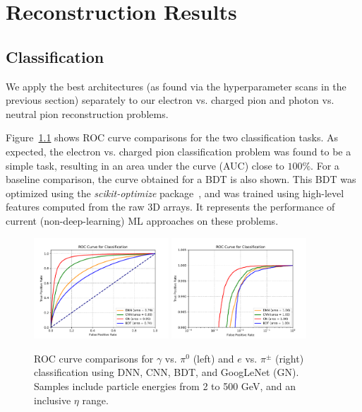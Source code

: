 \chapter{Reconstruction Results}

\section{Classification}

We apply the best architectures (as found via the hyperparameter scans in the previous section) separately to our electron vs. charged pion and photon vs. neutral pion reconstruction problems.

Figure~\ref{fig:architectures_ROC_comparisons} shows ROC curve comparisons for the two classification tasks. As expected, the electron vs. charged pion classification problem was found to be a simple task, resulting in an area under the curve (AUC) close to $100\%$. For a baseline comparison, the curve obtained for a BDT is also shown. This BDT was optimized using the {\it scikit-optimize} package~\cite{skopt}, and was trained using high-level features computed from the raw 3D arrays. It represents the performance of current (non-deep-learning) ML approaches on these problems.

\begin{figure}[htbp]
\centering
\includegraphics[width=0.45\textwidth]{Images/Calo/architectures_ROC_comparison_gamma_pi0_long.pdf}
\includegraphics[width=0.45\textwidth]{Images/Calo/architectures_ROC_comparison_ele_chpi_xlog.pdf}
\caption{ROC curve comparisons for $\gamma$ vs. $\pi^0$ (left) and $e$ vs. $\pi^\pm$ (right) classification using DNN, CNN, BDT, and GoogLeNet (GN). Samples include particle energies from 2 to 500 GeV, and an inclusive $\eta$ range.}
\label{fig:architectures_ROC_comparisons}
\end{figure}

